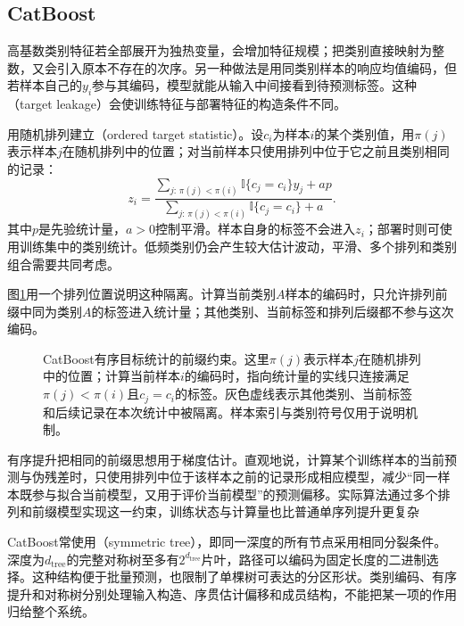 \subsection{CatBoost}
\label{sec:ensemble-catboost}

高基数类别特征若全部展开为独热变量，会增加特征规模；把类别直接映射为整数，又会引入原本不存在的次序。另一种做法是用同类别样本的响应均值编码，但若样本自己的$y_i$参与其编码，模型就能从输入中间接看到待预测标签。这种（target leakage）会使训练特征与部署特征的构造条件不同。

用随机排列建立（ordered target statistic）。设$c_i$为样本$i$的某个类别值，用$\pi(j)$表示样本$j$在随机排列中的位置；对当前样本只使用排列中位于它之前且类别相同的记录：
\begin{equation}
  z_i
  =
  \frac{
    \sum_{j:\,\pi(j)<\pi(i)}
    \mathbb{I}\{c_j=c_i\}y_j
    +ap
  }{
    \sum_{j:\,\pi(j)<\pi(i)}
    \mathbb{I}\{c_j=c_i\}
    +a
  }.
  \label{eq:ensemble-catboost-ordered-statistic}
\end{equation}
其中$p$是先验统计量，$a>0$控制平滑。样本自身的标签不会进入$z_i$；部署时则可使用训练集中的类别统计。低频类别仍会产生较大估计波动，平滑、多个排列和类别组合需要共同考虑。

图\ref{fig:ensemble-catboost-ordered-statistics}用一个排列位置说明这种隔离。计算当前类别$A$样本的编码时，只允许排列前缀中同为类别$A$的标签进入统计量；其他类别、当前标签和排列后缀都不参与这次编码。

\begin{figure}[htbp]
  \centering
  
  \caption{CatBoost有序目标统计的前缀约束。这里$\pi(j)$表示样本$j$在随机排列中的位置；计算当前样本$i$的编码时，指向统计量的实线只连接满足$\pi(j)<\pi(i)$且$c_j=c_i$的标签。灰色虚线表示其他类别、当前标签和后续记录在本次统计中被隔离。样本索引与类别符号仅用于说明机制。}
  \label{fig:ensemble-catboost-ordered-statistics}
\end{figure}

有序提升把相同的前缀思想用于梯度估计。直观地说，计算某个训练样本的当前预测与伪残差时，只使用排列中位于该样本之前的记录形成相应模型，减少“同一样本既参与拟合当前模型，又用于评价当前模型”的预测偏移。实际算法通过多个排列和前缀模型实现这一约束，训练状态与计算量也比普通单序列提升更复杂

CatBoost常使用（symmetric tree），即同一深度的所有节点采用相同分裂条件。深度为$d_{\mathrm{tree}}$的完整对称树至多有$2^{d_{\mathrm{tree}}}$片叶，路径可以编码为固定长度的二进制选择。这种结构便于批量预测，也限制了单棵树可表达的分区形状。类别编码、有序提升和对称树分别处理输入构造、序贯估计偏移和成员结构，不能把某一项的作用归给整个系统。

